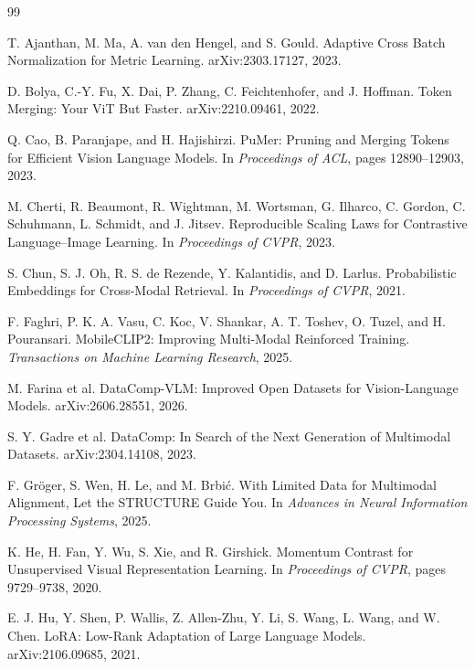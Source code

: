 \begin{thebibliography}{99}

T. Ajanthan, M. Ma, A. van den Hengel, and S. Gould.
\newblock Adaptive Cross Batch Normalization for Metric Learning.
\newblock arXiv:2303.17127, 2023.

D. Bolya, C.-Y. Fu, X. Dai, P. Zhang, C. Feichtenhofer, and J. Hoffman.
\newblock Token Merging: Your ViT But Faster.
\newblock arXiv:2210.09461, 2022.

Q. Cao, B. Paranjape, and H. Hajishirzi.
\newblock PuMer: Pruning and Merging Tokens for Efficient Vision Language Models.
\newblock In \emph{Proceedings of ACL}, pages 12890--12903, 2023.

M. Cherti, R. Beaumont, R. Wightman, M. Wortsman, G. Ilharco, C. Gordon,
C. Schuhmann, L. Schmidt, and J. Jitsev.
\newblock Reproducible Scaling Laws for Contrastive Language--Image Learning.
\newblock In \emph{Proceedings of CVPR}, 2023.

S. Chun, S. J. Oh, R. S. de Rezende, Y. Kalantidis, and D. Larlus.
\newblock Probabilistic Embeddings for Cross-Modal Retrieval.
\newblock In \emph{Proceedings of CVPR}, 2021.

F. Faghri, P. K. A. Vasu, C. Koc, V. Shankar, A. T. Toshev, O. Tuzel, and
H. Pouransari.
\newblock MobileCLIP2: Improving Multi-Modal Reinforced Training.
\newblock \emph{Transactions on Machine Learning Research}, 2025.

M. Farina et al.
\newblock DataComp-VLM: Improved Open Datasets for Vision-Language Models.
\newblock arXiv:2606.28551, 2026.

S. Y. Gadre et al.
\newblock DataComp: In Search of the Next Generation of Multimodal Datasets.
\newblock arXiv:2304.14108, 2023.

F. Gr\"oger, S. Wen, H. Le, and M. Brbi\'c.
\newblock With Limited Data for Multimodal Alignment, Let the STRUCTURE Guide You.
\newblock In \emph{Advances in Neural Information Processing Systems}, 2025.

K. He, H. Fan, Y. Wu, S. Xie, and R. Girshick.
\newblock Momentum Contrast for Unsupervised Visual Representation Learning.
\newblock In \emph{Proceedings of CVPR}, pages 9729--9738, 2020.

E. J. Hu, Y. Shen, P. Wallis, Z. Allen-Zhu, Y. Li, S. Wang, L. Wang, and
W. Chen.
\newblock LoRA: Low-Rank Adaptation of Large Language Models.
\newblock arXiv:2106.09685, 2021.


\end{thebibliography}
